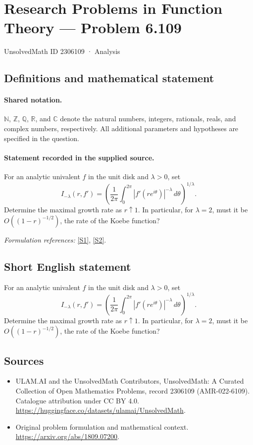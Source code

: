 \documentclass[11pt]{article}
\newcommand{\sref}[2]{\hyperlink{source:#1:#2}{[S#2]}}
\begin{document}
\setcounter{section}{2306108}
\section{Research Problems in Function Theory — Problem 6.109}\label{2306109}
{\small UnsolvedMath ID 2306109 · Analysis}
\subsection{Definitions and mathematical statement}

\paragraph{Shared notation.}$\mathbb N$, $\mathbb Z$, $\mathbb Q$, $\mathbb R$, and $\mathbb C$ denote the natural numbers, integers, rationals, reals, and complex numbers, respectively. All additional parameters and hypotheses are specified in the question.


\paragraph{Statement recorded in the supplied source.}
For an analytic univalent $f$ in the unit disk and $\lambda>0$, set
\[I_{-\lambda}(r,f')=\left(\frac1{2\pi}\int_0^{2\pi}|f'(re^{i\theta})|^{-\lambda}\,d\theta\right)^{1/\lambda}.\]
Determine the maximal growth rate as $r\uparrow1$. In particular, for $\lambda=2$, must it be $O((1-r)^{-1/2})$, the rate of the Koebe function?
\par\smallskip\textit{Formulation references:} \sref{2306109}{1}, \sref{2306109}{2}.
\subsection{Short English statement}
For an analytic univalent $f$ in the unit disk and $\lambda>0$, set
\[I_{-\lambda}(r,f')=\left(\frac1{2\pi}\int_0^{2\pi}|f'(re^{i\theta})|^{-\lambda}\,d\theta\right)^{1/\lambda}.\]
Determine the maximal growth rate as $r\uparrow1$. In particular, for $\lambda=2$, must it be $O((1-r)^{-1/2})$, the rate of the Koebe function?
\subsection{Sources}
\begin{itemize}
\item[\hypertarget{source:2306109:1}{S1}] ULAM.AI and the UnsolvedMath Contributors, UnsolvedMath: A Curated Collection of Open Mathematics Problems, record 2306109 (AMR-022-6109). Catalogue attribution under CC BY 4.0.
\url{https://huggingface.co/datasets/ulamai/UnsolvedMath}.
\item[\hypertarget{source:2306109:2}{S2}] Original problem formulation and mathematical context.
\url{https://arxiv.org/abs/1809.07200}.
\end{itemize}
\label{end:2306109}
\end{document}
